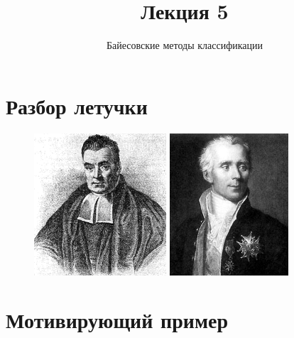\documentclass[10pt]{beamer}
\title{Лекция 5}
\subtitle{Байесовские методы классификации}
\begin{document}
\maketitle

\section{Разбор летучки}

\begin{frame}{}
	\centering
	\begin{figure}
		\begin{minipage}{.5\textwidth}
		  \includegraphics[width=0.9 \linewidth, height=150pt, keepaspectratio]{images/bayes}
		\end{minipage}%
		\begin{minipage}{.5\textwidth}				
			\includegraphics[width=0.9 \linewidth, height=150pt, keepaspectratio]{images/laplace}
		\end{minipage}
	\end{figure}
\end{frame}

\section{Мотивирующий пример}
\end{document}
